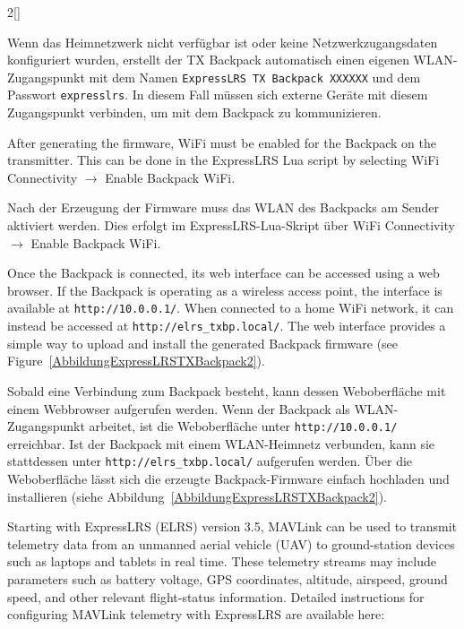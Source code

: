 \begin{paracol}{2}[]
\colger

Wenn das Heimnetzwerk nicht verfügbar ist oder keine Netzwerkzugangsdaten konfiguriert wurden, erstellt der TX Backpack automatisch einen eigenen WLAN-Zugangspunkt mit dem Namen \verb!ExpressLRS TX Backpack XXXXXX! und dem Passwort \verb!expresslrs!. In diesem Fall müssen sich externe Geräte mit diesem Zugangspunkt verbinden, um mit dem Backpack zu kommunizieren.

\coleng

After generating the firmware, WiFi must be enabled for the Backpack on the transmitter. This can be done in the ExpressLRS Lua script by selecting WiFi Connectivity $\rightarrow$ Enable Backpack WiFi.

\colger

Nach der Erzeugung der Firmware muss das WLAN des Backpacks am Sender aktiviert werden. Dies erfolgt im ExpressLRS-Lua-Skript über WiFi Connectivity $\rightarrow$ Enable Backpack WiFi.

\coleng

Once the Backpack is connected, its web interface can be accessed using a web browser. If the Backpack is operating as a wireless access point, the interface is available at \verb!http://10.0.0.1/!. When connected to a home WiFi network, it can instead be accessed at \verb!http://elrs_txbp.local/!. The web interface provides a simple way to upload and install the generated Backpack firmware (see Figure~\ref{AbbildungExpressLRSTXBackpack2}).

\colger

Sobald eine Verbindung zum Backpack besteht, kann dessen Weboberfläche mit einem Webbrowser aufgerufen werden. Wenn der Backpack als WLAN-Zugangspunkt arbeitet, ist die Weboberfläche unter \verb!http://10.0.0.1/! erreichbar. Ist der Backpack mit einem WLAN-Heimnetz verbunden, kann sie stattdessen unter \verb!http://elrs_txbp.local/! aufgerufen werden. Über die Weboberfläche lässt sich die erzeugte Backpack-Firmware einfach hochladen und installieren (siehe Abbildung~\ref{AbbildungExpressLRSTXBackpack2}).

\colende


\renewcommand{\deutschertitel}{ExpressLRS: MAVLink-Telemetrie über ExpressLRS}
\renewcommand{\englischertitel}{ExpressLRS: MAVLink Telemetry over ExpressLRS}
\makroabschnitt
\label{AbschnittExpressLRSMavlink}

Starting with ExpressLRS (ELRS) version 3.5, MAVLink can be used to transmit telemetry data from an unmanned aerial vehicle (UAV) to ground-station devices such as laptops and tablets in real time. These telemetry streams may include parameters such as battery voltage, GPS coordinates, altitude, airspeed, ground speed, and other relevant flight-status information. Detailed instructions for configuring MAVLink telemetry with ExpressLRS are available here:


\end{paracol}
